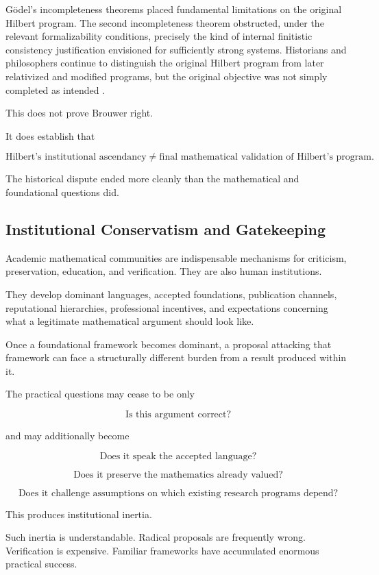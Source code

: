 \documentclass[11pt,a4paper]{article}
\begin{document}
Gödel's incompleteness theorems placed fundamental limitations on the
original Hilbert program. The second incompleteness theorem obstructed,
under the relevant formalizability conditions, precisely the kind of
internal finitistic consistency justification envisioned for
sufficiently strong systems. Historians and philosophers continue to
distinguish the original Hilbert program from later relativized and
modified programs, but the original objective was not simply completed
as intended \cite{SEPHilbertProgram,SEPGodelHilbert}.

This does not prove Brouwer right.

It does establish that

\[
\boxed{
\text{Hilbert's institutional ascendancy}
\neq
\text{final mathematical validation of Hilbert's program}.
}
\]

The historical dispute ended more cleanly than the mathematical and
foundational questions did.

\subsection{Institutional Conservatism and Gatekeeping}

Academic mathematical communities are indispensable mechanisms for
criticism, preservation, education, and verification. They are also
human institutions.

They develop dominant languages, accepted foundations, publication
channels, reputational hierarchies, professional incentives, and
expectations concerning what a legitimate mathematical argument should
look like.

Once a foundational framework becomes dominant, a proposal attacking
that framework can face a structurally different burden from a result
produced within it.

The practical questions may cease to be only

\[
\text{Is this argument correct?}
\]

and may additionally become

\[
\text{Does it speak the accepted language?}
\]

\[
\text{Does it preserve the mathematics already valued?}
\]

\[
\text{Does it challenge assumptions on which existing research
programs depend?}
\]

This produces institutional inertia.

Such inertia is understandable. Radical proposals are frequently
wrong. Verification is expensive. Familiar frameworks have accumulated
enormous practical success.
\end{document}
